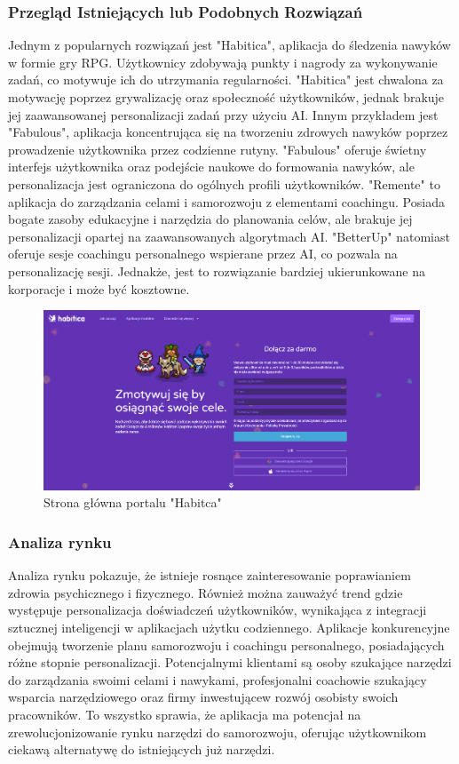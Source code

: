 \subsubsection{Przegląd Istniejących lub Podobnych Rozwiązań}
Jednym z popularnych rozwiązań jest "Habitica", aplikacja do śledzenia nawyków w formie gry RPG. Użytkownicy zdobywają punkty i nagrody za wykonywanie zadań, co motywuje ich do utrzymania regularności. "Habitica" jest chwalona za motywację poprzez grywalizację oraz społeczność użytkowników, jednak brakuje jej zaawansowanej personalizacji zadań przy użyciu AI.
Innym przykładem jest "Fabulous", aplikacja koncentrująca się na tworzeniu zdrowych nawyków poprzez prowadzenie użytkownika przez codzienne rutyny. "Fabulous" oferuje świetny interfejs użytkownika oraz podejście naukowe do formowania nawyków, ale personalizacja jest ograniczona do ogólnych profili użytkowników.
"Remente" to aplikacja do zarządzania celami i samorozwoju z elementami coachingu. Posiada bogate zasoby edukacyjne i narzędzia do planowania celów, ale brakuje jej personalizacji opartej na zaawansowanych algorytmach AI. "BetterUp" natomiast oferuje sesje coachingu personalnego wspierane przez AI, co pozwala na personalizację sesji. Jednakże, jest to rozwiązanie bardziej ukierunkowane na korporacje i może być kosztowne.

\begin{figure}[H]
    \centering
    \includegraphics[width=1\linewidth]{Obrazy/habitcaSignIn.png}
    \caption{Strona główna portalu "Habitca"}
    \label{fig:enter-label}
\end{figure}

\subsubsection{Analiza rynku}
Analiza rynku pokazuje, że istnieje rosnące zainteresowanie poprawianiem zdrowia psychicznego i fizycznego. Również można zauważyć trend gdzie występuje personalizacja doświadczeń użytkowników, wynikająca z integracji sztucznej inteligencji w aplikacjach użytku codziennego. Aplikacje konkurencyjne obejmują tworzenie planu samorozwoju i coachingu personalnego, posiadających różne stopnie personalizacji. Potencjalnymi klientami są osoby szukające narzędzi do zarządzania swoimi celami i nawykami, profesjonalni coachowie szukający wsparcia narzędziowego oraz firmy inwestujące\linebreak w rozwój osobisty swoich pracowników.
To wszystko sprawia, że aplikacja ma potencjał na zrewolucjonizowanie rynku narzędzi do samorozwoju, oferując użytkownikom ciekawą alternatywę do istniejących już narzędzi.

